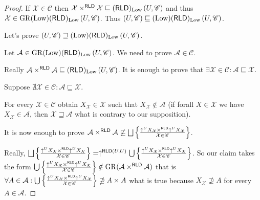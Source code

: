 \begin{proof}
  If $\mathcal{X} \in \mathscr{C}$ then $\mathcal{X}
  \times^{\mathsf{RLD}} \mathcal{X} \sqsubseteq
  (\mathsf{RLD})_{\operatorname{Low}} \left( U , \mathscr{C} \right)$ and thus
  $\mathcal{X} \in \operatorname{GR} (\operatorname{Low}) (\mathsf{RLD})_{\operatorname{Low}}
  \left( U , \mathscr{C} \right)$. Thus $\left( U , \mathscr{C} \right)
  \sqsubseteq (\operatorname{Low}) (\mathsf{RLD})_{\operatorname{Low}} \left( U ,
  \mathscr{C} \right)$.
  
  Let's prove $\left( U , \mathscr{C} \right) \sqsupseteq (\operatorname{Low})
  (\mathsf{RLD})_{\operatorname{Low}} \left( U , \mathscr{C} \right)$.
  
  Let $\mathcal{A} \in \operatorname{GR} (\operatorname{Low})
  (\mathsf{RLD})_{\operatorname{Low}} \left( U , \mathscr{C} \right)$. We need
  to prove $\mathcal{A} \in \mathscr{C}$.
  
  Really $\mathcal{A} \times^{\mathsf{RLD}} \mathcal{A} \sqsubseteq
  (\mathsf{RLD})_{\operatorname{Low}} \left( U , \mathscr{C} \right)$. It is
  enough to prove that $\exists \mathcal{X} \in \mathscr{C} : \mathcal{A}
  \sqsubseteq \mathcal{X}$.
  
  Suppose $\nexists \mathcal{X} \in \mathscr{C} : \mathcal{A} \sqsubseteq
  \mathcal{X}$.
  
  For every $\mathcal{X} \in \mathscr{C}$ obtain $X_{\mathcal{X}} \in
  \mathcal{X}$ such that $X_{\mathcal{X}} \notin \mathcal{A}$ (if forall $X \in
  \mathcal{X}$ we have $X_{\mathcal{X}} \in \mathcal{A}$, then $\mathcal{X}
  \sqsupseteq \mathcal{A}$ what is contrary to our supposition).
  
  It is now enough to prove $\mathcal{A} \times^{\mathsf{RLD}}
  \mathcal{A} \nsqsubseteq \bigsqcup \setcond{ \uparrow^U
  X_{\mathcal{X}} \times^{\mathsf{RLD}} \uparrow^U X_{\mathcal{X}}
  }{\mathcal{X} \in \mathscr{C} }$.
  
  Really, $\bigsqcup \setcond{ \uparrow^U X_{\mathcal{X}}
  \times^{\mathsf{RLD}} \uparrow^U X_{\mathcal{X}} }{
  \mathcal{X} \in \mathscr{C} } =
  \uparrow^{\mathsf{RLD} (U , U)} \bigcup \setcond{ \uparrow^U X_{\mathcal{X}}
  \times^{\mathsf{RLD}} \uparrow^U X_{\mathcal{X}} }{
  \mathcal{X} \in \mathscr{C} }$. So our claim takes the form $\bigcup \left\{ \frac{ \uparrow^U X_{\mathcal{X}}
  \times^{\mathsf{RLD}} \uparrow^U X_{\mathcal{X}} }{
  \mathcal{X} \in \mathscr{C} }\right\} \notin \operatorname{GR} (\mathcal{A}
  \times^{\mathsf{RLD}} \mathcal{A})$ that is $\forall A \in
  \mathcal{A} : \bigcup \left\{ \frac{ \uparrow^U X_{\mathcal{X}}
  \times^{\mathsf{RLD}} \uparrow^U X_{\mathcal{X}} }{
  \mathcal{X} \in \mathscr{C} }\right\} \nsupseteq
  A \times A$ what is true because $X_{\mathcal{X}} \nsupseteq A$ for every $A
  \in \mathcal{A}$.
\end{proof}

